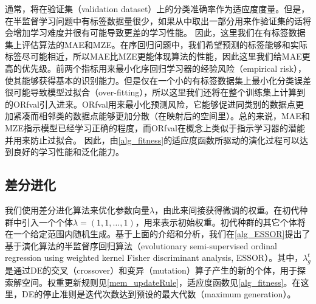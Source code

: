 通常，将在验证集（validation dataset）上的分类准确率作为适应度度量。但是，在半监督学习问题中有标签数据量很少，如果从中取出一部分用来作验证集的话将会增加学习难度并很有可能导致更差的学习性能。 因此，这里我们在有标签数据集上评估算法的MAE和MZE。在序回归问题中，我们希望预测的标签能够和实际标签尽可能相近，所以MAE比MZE更能体现算法的性能，因此这里我们给MAE更高的优先级。前两个指标用来最小化序回归学习器的经验风险（empirical risk），使其能够获得基本的识别能力。但是仅在一个小的有标签数据集上最小化分类误差很可能导致模型过拟合（over-fitting），所以这里我们还将在整个训练集上计算到的ORfval引入进来。ORfval用来最小化预测风险，它能够促进同类别的数据点更加紧凑而相邻类的数据点能够更加分散（在映射后的空间里）。总的来说，MAE和MZE指示模型已经学习正确的程度，而ORfval在概念上类似于指示学习器的潜能并用来防止过拟合\citep{liu2000evolutionary}\citep{liu2003evolutionary}。
因此，由\autoref{alg_fitness}的适应度函数所驱动的演化过程可以达到良好的学习性能和泛化能力。

\subsection{差分进化}
我们使用差分进化算法来优化参数向量\(\lambda\)，由此来间接获得微调的权重。在初代种群中引入一个个体\(\lambda=(1,1,\dots,1)\)，用来表示初始权重。初代种群的其它个体将在一个给定范围内随机生成。基于上面的介绍和分析，我们在\autoref{alg_ESSOR}提出了基于演化算法的半监督序回归算法（evolutionary semi-supervised ordinal regression using weighted kernel Fisher discriminant analysis, ESSOR）。其中，\(\lambda_{g}^{t}\)是通过DE的交叉（crossover）和变异（mutation）算子产生的新的个体，用于探索解空间。权重更新规则见\autoref{mem_updateRule}，适应度函数见\autoref{alg_fitness}。在这里，DE的停止准则是迭代次数达到预设的最大代数（maximum generation）。

